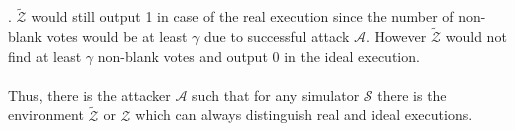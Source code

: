 \documentclass[12pt]{article}
\begin{document}
.
$\tilde{\mathcal{Z}}$ would still output 1 in case of the real execution since the number of non-blank votes would be at least $\gamma$ due to successful attack  $\mathcal{A}$. However  $\tilde{\mathcal{Z}}$ would not find at least $\gamma$ non-blank votes and output 0 in the ideal execution. \\\\
Thus, there is the attacker $\mathcal{A}$ such that for any simulator $\mathcal{S}$ there is the environment $\tilde{\mathcal{Z}}$ or $\mathcal{Z}$ which can always distinguish real and ideal executions. \\\\
\end{document}
